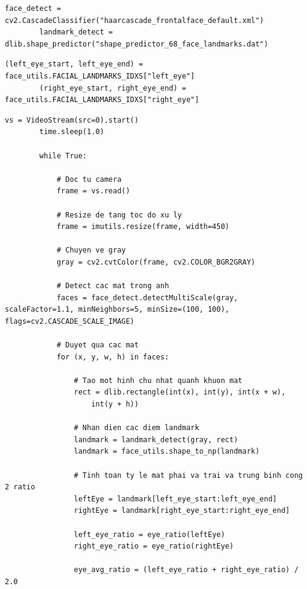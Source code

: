     \begin{lstlisting}[caption={Khoi tao cac module detect mat va facial landmark}]
        face_detect = cv2.CascadeClassifier("haarcascade_frontalface_default.xml")
        landmark_detect = dlib.shape_predictor("shape_predictor_68_face_landmarks.dat")
    \end{lstlisting}

    \begin{lstlisting}[caption={Lay danh sach cac cum diem landmark cho 2 mat}]
        (left_eye_start, left_eye_end) = face_utils.FACIAL_LANDMARKS_IDXS["left_eye"]
        (right_eye_start, right_eye_end) = face_utils.FACIAL_LANDMARKS_IDXS["right_eye"]
    \end{lstlisting}

    \begin{lstlisting}[caption={Doc tu camera}]
        vs = VideoStream(src=0).start()
        time.sleep(1.0)

        while True:

            # Doc tu camera
            frame = vs.read()

            # Resize de tang toc do xu ly
            frame = imutils.resize(frame, width=450)

            # Chuyen ve gray
            gray = cv2.cvtColor(frame, cv2.COLOR_BGR2GRAY)

            # Detect cac mat trong anh
            faces = face_detect.detectMultiScale(gray, scaleFactor=1.1,	minNeighbors=5, minSize=(100, 100),	flags=cv2.CASCADE_SCALE_IMAGE)

            # Duyet qua cac mat
            for (x, y, w, h) in faces:

                # Tao mot hinh chu nhat quanh khuon mat
                rect = dlib.rectangle(int(x), int(y), int(x + w),
                    int(y + h))

                # Nhan dien cac diem landmark
                landmark = landmark_detect(gray, rect)
                landmark = face_utils.shape_to_np(landmark)

                # Tinh toan ty le mat phai va trai va trung binh cong 2 ratio
                leftEye = landmark[left_eye_start:left_eye_end]
                rightEye = landmark[right_eye_start:right_eye_end]

                left_eye_ratio = eye_ratio(leftEye)
                right_eye_ratio = eye_ratio(rightEye)

                eye_avg_ratio = (left_eye_ratio + right_eye_ratio) / 2.0


\end{lstlisting}
